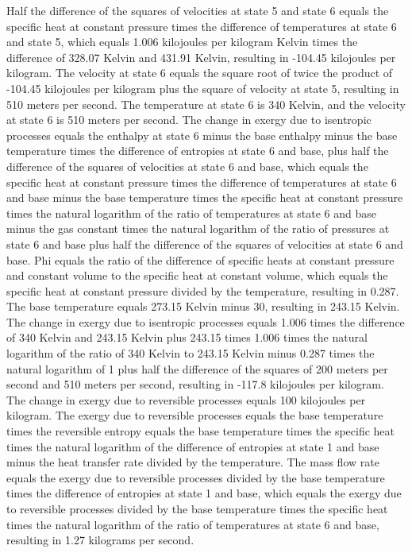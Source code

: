 Half the difference of the squares of velocities at state 5 and state 6 equals the specific heat at constant pressure times the difference of temperatures at state 6 and state 5, which equals 1.006 kilojoules per kilogram Kelvin times the difference of 328.07 Kelvin and 431.91 Kelvin, resulting in -104.45 kilojoules per kilogram.
The velocity at state 6 equals the square root of twice the product of -104.45 kilojoules per kilogram plus the square of velocity at state 5, resulting in 510 meters per second.
The temperature at state 6 is 340 Kelvin, and the velocity at state 6 is 510 meters per second.
The change in exergy due to isentropic processes equals the enthalpy at state 6 minus the base enthalpy minus the base temperature times the difference of entropies at state 6 and base, plus half the difference of the squares of velocities at state 6 and base, which equals the specific heat at constant pressure times the difference of temperatures at state 6 and base minus the base temperature times the specific heat at constant pressure times the natural logarithm of the ratio of temperatures at state 6 and base minus the gas constant times the natural logarithm of the ratio of pressures at state 6 and base plus half the difference of the squares of velocities at state 6 and base.
Phi equals the ratio of the difference of specific heats at constant pressure and constant volume to the specific heat at constant volume, which equals the specific heat at constant pressure divided by the temperature, resulting in 0.287.
The base temperature equals 273.15 Kelvin minus 30, resulting in 243.15 Kelvin.
The change in exergy due to isentropic processes equals 1.006 times the difference of 340 Kelvin and 243.15 Kelvin plus 243.15 times 1.006 times the natural logarithm of the ratio of 340 Kelvin to 243.15 Kelvin minus 0.287 times the natural logarithm of 1 plus half the difference of the squares of 200 meters per second and 510 meters per second, resulting in -117.8 kilojoules per kilogram.
The change in exergy due to reversible processes equals 100 kilojoules per kilogram.
The exergy due to reversible processes equals the base temperature times the reversible entropy equals the base temperature times the specific heat times the natural logarithm of the difference of entropies at state 1 and base minus the heat transfer rate divided by the temperature.
The mass flow rate equals the exergy due to reversible processes divided by the base temperature times the difference of entropies at state 1 and base, which equals the exergy due to reversible processes divided by the base temperature times the specific heat times the natural logarithm of the ratio of temperatures at state 6 and base, resulting in 1.27 kilograms per second.
